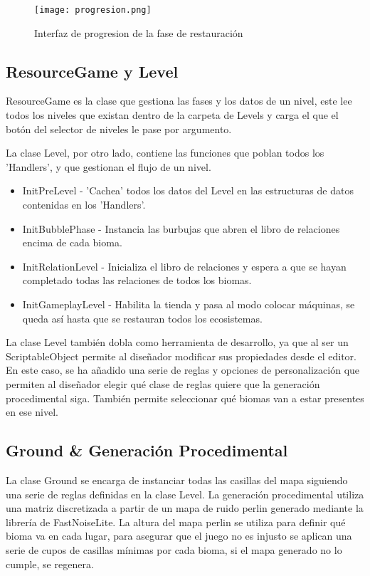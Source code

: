 \begin{figure}[H]
    \centering
      \texttt{[image: progresion.png]}
    \caption{Interfaz de progresion de la fase de restauración}
    \label{fig:progresion}
  \end{figure}

\subsection{ResourceGame y Level}

ResourceGame es la clase que gestiona las fases y los datos de un nivel, este lee todos los niveles que existan dentro de la carpeta de Levels y carga el que el botón del selector de niveles le pase por argumento.

La clase Level, por otro lado, contiene las funciones que poblan todos los 'Handlers', y que gestionan el flujo de un nivel.
\begin{itemize}
    \item InitPreLevel - 'Cachea' todos los datos del Level en las estructuras de datos contenidas en los 'Handlers'.
    \item InitBubblePhase - Instancia las burbujas que abren el libro de relaciones encima de cada bioma.
    \item InitRelationLevel - Inicializa el libro de relaciones y espera a que se hayan completado todas las relaciones de todos los biomas.
    \item InitGameplayLevel - Habilita la tienda y pasa al modo colocar máquinas, se queda así hasta que se restauran todos los ecosistemas.
\end{itemize}

La clase Level también dobla como herramienta de desarrollo, ya que al ser un ScriptableObject permite al diseñador modificar sus propiedades desde el editor. En este caso, se ha añadido una serie de reglas y opciones de personalización que permiten al diseñador elegir qué clase de reglas quiere que la generación procedimental siga. También permite seleccionar qué biomas van a estar presentes en ese nivel. 

\subsection{Ground \& Generación Procedimental}

La clase Ground se encarga de instanciar todas las casillas del mapa siguiendo una serie de reglas definidas en la clase Level. La generación procedimental utiliza una matriz discretizada a partir de un mapa de ruido perlin generado mediante la librería de FastNoiseLite\cite{FastNoiseLite}. La altura del mapa perlin se utiliza para definir qué bioma va en cada lugar, para asegurar que el juego no es injusto se aplican una serie de cupos de casillas mínimas por cada bioma, si el mapa generado no lo cumple, se regenera.

